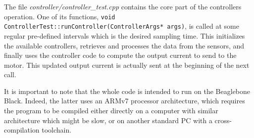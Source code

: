 The file \textit{controller/controller\_test.cpp} contains the core part of the controllers operation. One of its functions, \lstinline{void ControllerTest::runController(ControllerArgs* args)}, is called at some regular pre-defined intervals which is the desired sampling time. This initializes the available controllers, retrieves and processes the data from the sensors, and finally uses the controller code to compute the output current to send to the motor. This updated output current is actually sent at the beginning of the next call.

It is important to note that the whole code is intended to run on the Beaglebone Black. Indeed, the latter uses an ARMv7 processor architecture, which requires the program to be compiled either directly on a computer with similar architecture which might be slow, or on another standard PC with a cross-compilation toolchain.
\\\\